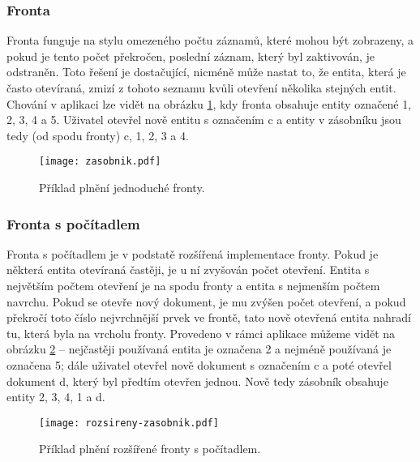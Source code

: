 \subsubsection{Fronta}
\par Fronta funguje na stylu omezeného počtu záznamů, které mohou být zobrazeny, a pokud je tento počet překročen, poslední záznam, který byl zaktivován, je odstraněn. Toto řešení je dostačující, nicméně může nastat to, že entita, která je často otevíraná, zmizí z tohoto seznamu kvůli otevření několika stejných entit. Chování v aplikaci lze vidět na obrázku \ref{zasobnik}, kdy fronta obsahuje entity označené 1, 2, 3, 4 a 5. Uživatel otevřel nově entitu s označením c a entity v zásobníku jsou tedy (od spodu fronty) c, 1, 2, 3 a 4.
\begin{figure}[htp]
\centering
\texttt{[image: zasobnik.pdf]}
\caption{Příklad plnění jednoduché fronty.}
\label{zasobnik}
\end{figure}

\subsubsection{Fronta s počítadlem}
\par Fronta s počítadlem je v podstatě rozšířená implementace fronty. Pokud je některá entita otevíraná častěji, je u ní zvyšován počet otevření. Entita s největším počtem otevření je na spodu fronty a entita s nejmenším počtem navrchu. Pokud se otevře nový dokument, je mu zvýšen počet otevření, a pokud překročí toto číslo nejvrchnější prvek ve frontě, tato nově otevřená entita nahradí tu, která byla na vrcholu fronty. Provedeno v rámci aplikace můžeme vidět na obrázku \ref{counter} -- nejčastěji používaná entita je označena 2 a nejméně používaná je označena 5; dále uživatel otevřel nově dokument s označením c a poté otevřel dokument d, který byl předtím otevřen jednou. Nově tedy zásobník obsahuje entity 2, 3, 4, 1 a d.
\begin{figure}[htp]
\centering
\texttt{[image: rozsireny-zasobnik.pdf]}
\caption{Příklad plnění rozšířené fronty s počítadlem.}
\label{counter}
\end{figure}

